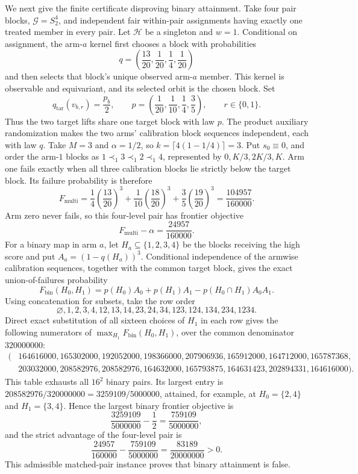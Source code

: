 We next give the finite certificate disproving binary attainment. Take four pair blocks, \(\mathcal G=S_2^4\), and independent fair within-pair assignments having exactly one treated member in every pair. Let \(\mathcal H\) be a singleton and \(w=1\). Conditional on assignment, the arm-\(a\) kernel first chooses a block with probabilities
\[q=\left(\frac{13}{20},\frac1{20},\frac14,\frac1{20}\right)\]
and then selects that block's unique observed arm-\(a\) member. This kernel is observable and equivariant, and its selected orbit is the chosen block. Set
\[q_{\mathrm{tar}}(v_{b,r})=\frac{p_b}{2},\qquad p=\left(\frac1{20},\frac1{10},\frac14,\frac35\right),\qquad r\in\{0,1\}.\]
Thus the two target lifts share one target block with law \(p\). The product auxiliary randomization makes the two arms' calibration block sequences independent, each with law \(q\). Take \(M=3\) and \(\alpha=1/2\), so \(k=\lceil4(1-1/4)\rceil=3\). Put \(s_0\equiv0\), and order the arm-\(1\) blocks as \(1\prec_1 3\prec_1 2\prec_1 4\), represented by \(0,K/3,2K/3,K\). Arm one fails exactly when all three calibration blocks lie strictly below the target block. Its failure probability is therefore
\[F_{\mathrm{multi}}=\frac14\left(\frac{13}{20}\right)^3+\frac1{10}\left(\frac{18}{20}\right)^3+\frac35\left(\frac{19}{20}\right)^3=\frac{104957}{160000}.\]
Arm zero never fails, so this four-level pair has frontier objective
\[F_{\mathrm{multi}}-\alpha=\frac{24957}{160000}.\]
For a binary map in arm \(a\), let \(H_a\subseteq\{1,2,3,4\}\) be the blocks receiving the high score and put \(A_a=(1-q(H_a))^3\). Conditional independence of the armwise calibration sequences, together with the common target block, gives the exact union-of-failures probability
\[F_{\mathrm{bin}}(H_0,H_1)=p(H_0)A_0+p(H_1)A_1-p(H_0\cap H_1)A_0A_1.\]
Using concatenation for subsets, take the row order
\[\varnothing,1,2,3,4,12,13,14,23,24,34,123,124,134,234,1234.\]
Direct exact substitution of all sixteen choices of \(H_1\) in each row gives the following numerators of \(\max_{H_1}F_{\mathrm{bin}}(H_0,H_1)\), over the common denominator \(320000000\):
\[\begin{split}(&164616000,165302000,192052000,198366000,207906936,165912000,164712000,165787368,\\&203032000,208582976,208582976,164632000,165793875,164631423,202894331,164616000).\end{split}\]
This table exhausts all \(16^2\) binary pairs. Its largest entry is \(208582976/320000000=3259109/5000000\), attained, for example, at \(H_0=\{2,4\}\) and \(H_1=\{3,4\}\). Hence the largest binary frontier objective is
\[\frac{3259109}{5000000}-\frac12=\frac{759109}{5000000},\]
and the strict advantage of the four-level pair is
\[\frac{24957}{160000}-\frac{759109}{5000000}=\frac{83189}{20000000}>0.\]
This admissible matched-pair instance proves that binary attainment is false.

